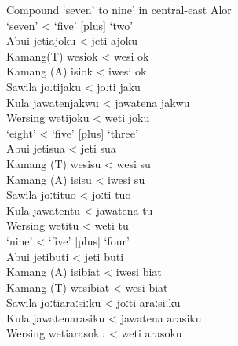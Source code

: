 \let\eachwordone=\rm
\let\eachwordtwo=\it
\let\eachwordthree=\it
\let\eachwordfour=\it
\let\eachwordfive=\it
\let\eachwordsix=\it
\let\eachwordseven=\it

\ea%
\label{ex:6:6}
\upshape Compound `seven' to nine' in central-east Alor\\
\ea
\glllllll   { }    		`seven'      		{\textless}  `five'  		[plus]  `two' \\
{\rm Abui}    		{jeti}{{\ng}}{ajoku}    	{\textless}  {jeti}{{\ng}} 	{}   	{ajoku}\\
{\rm Kamang(T)}  	{wesi}{{\ng}}{ok} 	{\textless}  {wesi}{{\ng}}   	{} 	{ok}\\
{\rm Kamang{ }(A)}  		{isi{\ng}ok}      	{\textless}  {iwesi{\ng}}  	{}  	{ok}\\
{\rm Sawila}    	{joːti{\ng}jaku}     	{\textless}  {joːti{\ng}} 	{}   	{jaku}\\
{\rm Kula}    		{jawatenjakwu}    	{\textless}  {jawatena} 		{} 	{jakwu}\\
{\rm Wersing}  	{weti{\ng}joku}    	{\textless}  {weti{\ng}} 	{}	{joku}\\
\ex 
\glllllll    { } 	`eight'      		{\textless}  `five'  	[plus]  `three'\\
{\rm Abui}    		{jeti}{{\ng}}{sua}    	{\textless}  {jeti{\ng}} 	{} {sua}\\
{\rm Kamang{ }(T)}  	{wesi{\ng}su}   		{\textless}  {wesi{\ng}} {}  {su}\\
{\rm Kamang{ }(A)}  	{isi{\ng}su}      	{\textless}  {iwesi{\ng}} {}  {su}\\
{\rm Sawila}   	 	{joːti{\ng}tuo}     	{\textless}  {joːti{\ng}}  {}  {tuo}\\
{\rm Kula}    		{jawatentu}\hspace{.8cm}  {\textless} {jawatena} 	{} {tu}\\
{\rm Wersing}  		{weti{\ng}tu}      	{\textless}  {weti{\ng}} 	{}   {tu}\\
\ex   
\glllllll    { }   	`nine'      		{\textless}  `five'  	[plus]  `four' \\
{\rm Abui}    		{jeti}{{\ng}}{buti}    	{\textless}  {jeti{\ng}}  {}    {buti}\\
{\rm Kamang{ }(A)}  	{isi{\ng}biat}   	{\textless}  {iwesi{\ng}}  {}  {biat}\\
{\rm Kamang{ }(T)}	{wesi{\ng}biat}  	{\textless}  {wesi{\ng}}  {}  {biat}\\
{\rm Sawila}   		{joːti{\ng}araːsiːku} 	{\textless}  {joːti{\ng}}  {}  {araːsiːku}\\
{\rm Kula}    		{jawatenarasiku}  	{\textless}  {jawatena}  {}  {arasiku}\\
{\rm Wersing}  		{weti{\ng}arasoku}    	{\textless}  {weti{\ng}}   {}   {arasoku}\\
\z
\z


